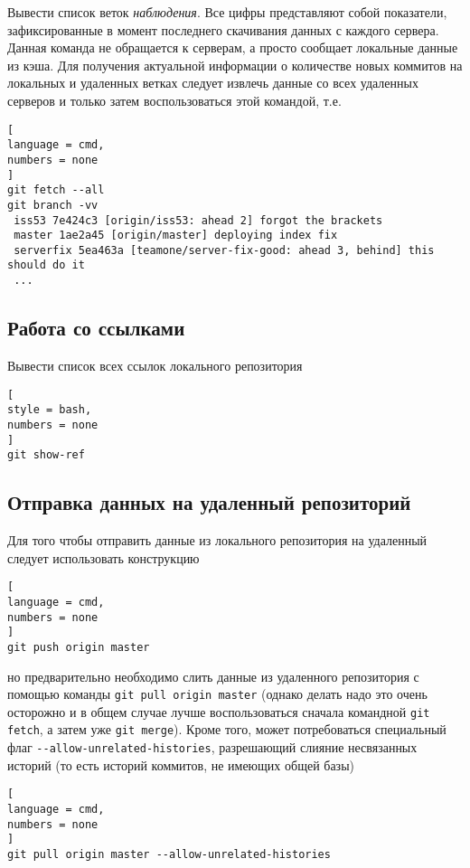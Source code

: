 \documentclass[%
	11pt,
	a4paper,
	utf8,
		]{article}
\begin{document}
Вывести список веток \emph{наблюдения}. Все цифры представляют собой показатели, зафиксированные в момент последнего скачивания данных с каждого сервера. Данная команда не обращается к серверам, а просто сообщает локальные данные из кэша. Для получения актуальной информации о количестве новых коммитов на локальных и удаленных ветках следует извлечь данные со всех удаленных серверов и только затем воспользоваться этой командой, т.е.
\begin{lstlisting}[
language = cmd,
numbers = none
]
git fetch --all
git branch -vv
 iss53 7e424c3 [origin/iss53: ahead 2] forgot the brackets
 master 1ae2a45 [origin/master] deploying index fix
 serverfix 5ea463a [teamone/server-fix-good: ahead 3, behind] this should do it
 ...
\end{lstlisting} 

\subsection{Работа со ссылками}

Вывести список всех ссылок локального репозитория
\begin{lstlisting}[
style = bash,
numbers = none
]
git show-ref
\end{lstlisting}


\subsection{Отправка данных на удаленный репозиторий}

Для того чтобы отправить данные из локального репозитория на удаленный следует использовать конструкцию

\begin{lstlisting}[
language = cmd,
numbers = none
]
git push origin master
\end{lstlisting}

\noindent но предварительно необходимо слить данные из удаленного репозитория с помощью команды \texttt{git pull origin master} (однако делать надо это очень осторожно и в общем случае лучше воспользоваться сначала командной \texttt{git fetch}, а затем уже \texttt{git merge}). Кроме того, может потребоваться специальный флаг \verb|--allow-unrelated-histories|, разрешающий слияние несвязанных историй (то есть историй коммитов, не имеющих общей базы)

\begin{lstlisting}[
language = cmd,
numbers = none
]
git pull origin master --allow-unrelated-histories
\end{lstlisting}
\end{document}
